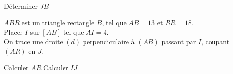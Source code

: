 \documentclass[../Cours.tex]{subfiles}
\begin{document}
\begin{questions}
    \question Déterminer $JB$


    $ABR$ est un triangle rectangle $B$, tel que $AB = 13$ et $BR = 18$. \\
    Placer $I$ sur $[AB]$ tel que $AI=4$. \\
    On trace une droite $(d)$ perpendiculaire à $(AB)$ passant par $I$, coupant $(AR)$ en $J$.

    \question Calculer $AR$
    \question Calculer $IJ$

    
\end{questions}
\end{document}
